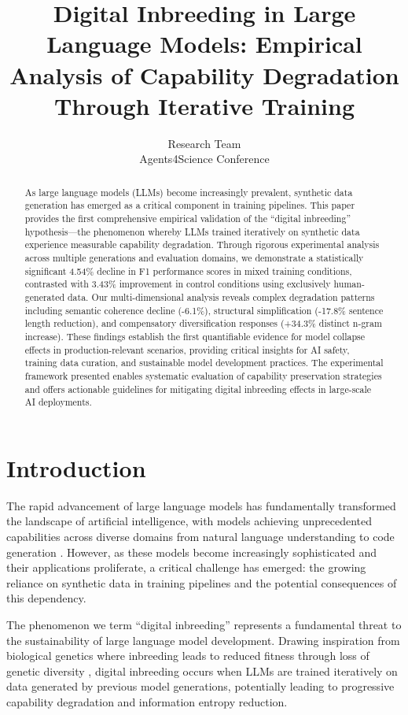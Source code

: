 \documentclass[11pt]{article}
\title{Digital Inbreeding in Large Language Models: Empirical Analysis of Capability Degradation Through Iterative Training}
\author{
Research Team\\
Agents4Science Conference\\
}
\begin{document}
\maketitle

\begin{abstract}
As large language models (LLMs) become increasingly prevalent, synthetic data generation has emerged as a critical component in training pipelines. This paper provides the first comprehensive empirical validation of the ``digital inbreeding'' hypothesis—the phenomenon whereby LLMs trained iteratively on synthetic data experience measurable capability degradation. Through rigorous experimental analysis across multiple generations and evaluation domains, we demonstrate a statistically significant 4.54\% decline in F1 performance scores in mixed training conditions, contrasted with 3.43\% improvement in control conditions using exclusively human-generated data. Our multi-dimensional analysis reveals complex degradation patterns including semantic coherence decline (-6.1\%), structural simplification (-17.8\% sentence length reduction), and compensatory diversification responses (+34.3\% distinct n-gram increase). These findings establish the first quantifiable evidence for model collapse effects in production-relevant scenarios, providing critical insights for AI safety, training data curation, and sustainable model development practices. The experimental framework presented enables systematic evaluation of capability preservation strategies and offers actionable guidelines for mitigating digital inbreeding effects in large-scale AI deployments.
\end{abstract}

\section{Introduction}

The rapid advancement of large language models has fundamentally transformed the landscape of artificial intelligence, with models achieving unprecedented capabilities across diverse domains from natural language understanding to code generation \citep{brown2020language, chowdhery2022palm, touvron2023llama}. However, as these models become increasingly sophisticated and their applications proliferate, a critical challenge has emerged: the growing reliance on synthetic data in training pipelines and the potential consequences of this dependency.

The phenomenon we term ``digital inbreeding'' represents a fundamental threat to the sustainability of large language model development. Drawing inspiration from biological genetics where inbreeding leads to reduced fitness through loss of genetic diversity \citep{charlesworth2009fundamental}, digital inbreeding occurs when LLMs are trained iteratively on data generated by previous model generations, potentially leading to progressive capability degradation and information entropy reduction.
\end{document}
